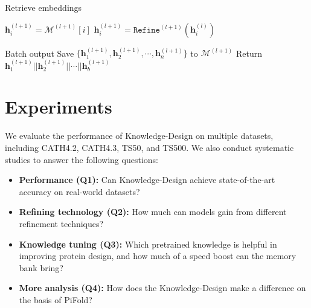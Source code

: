 \documentclass{article}
\begin{document}
\begin{minipage}{\linewidth}
\begin{minipage}{0.5\linewidth}
\begin{algorithm}[H]
\begin{small}
\begin{algorithmic}[1]
                \State
                
                 Retrieve embeddings

                \For{$i \in [0, b)$} 
                        \State $\boldsymbol{h}_i^{(l+1)} = \mathcal{M}^{(l+1)}[i]$
                    \Else
                        \State $\boldsymbol{h}_i^{(l+1)} = \texttt{Refine}^{(l+1)}(\boldsymbol{h}_i^{(l)})$
                    \EndIf
                \EndFor
                \State
        
                 Batch output
                \State Save $\{\boldsymbol{h}_{1}^{(l+1)}, \boldsymbol{h}_{2}^{(l+1)}, \cdots, \boldsymbol{h}_{n}^{(l+1)}\}$ to $\mathcal{M}^{(l+1)}$
                \State Return $\boldsymbol{h}_1^{(l+1)} || \boldsymbol{h}_2^{(l+1)} || \cdots || \boldsymbol{h}_b^{(l+1)}$
            \end{algorithmic}
        \end{small}
        \end{algorithm}
    \end{minipage}
\end{minipage}
 







 \vspace{-3mm}
\section{Experiments}
\vspace{-3mm}
We evaluate the performance of Knowledge-Design on multiple datasets, including CATH4.2, CATH4.3, TS50, and TS500. We also conduct systematic studies to answer the following questions:
\begin{itemize}[leftmargin=5.5mm]
   \vspace{-2mm}
   \item \textbf{Performance (Q1):} Can Knowledge-Design achieve state-of-the-art accuracy on real-world datasets?
   \vspace{-1mm}
   \item \textbf{Refining technology (Q2):} How much can models gain from different refinement techniques?
   \vspace{-1mm}
   \item \textbf{Knowledge tuning (Q3):}  Which pretrained knowledge is helpful in improving protein design, and how much of a speed boost can the memory bank bring?
   \vspace{-1mm}
   \item \textbf{More analysis (Q4):} How does the Knowledge-Design make a difference on the basis of PiFold?
   \vspace{-1mm}
\end{itemize}
\vspace{-3mm}
\end{document}

